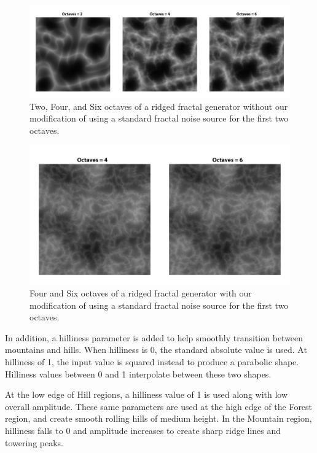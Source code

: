 \begin{figure}
	\centering
		\includegraphics[width=1.0\textwidth]{figures/original_ridged}
	\caption{Two, Four, and Six octaves of a ridged fractal generator without our modification of using a standard fractal noise source for the first two octaves.}
	\label{fig:original_ridged}
\end{figure}

\begin{figure}
	\centering
		\includegraphics[width=1.0\textwidth]{figures/my_ridged}
	\caption{Four and Six octaves of a ridged fractal generator with our modification of using a standard fractal noise source for the first two octaves.}
	\label{fig:my_ridged}
\end{figure}

In addition, a hilliness parameter is added to help smoothly transition between mountains and hills.
When hilliness is 0, the standard absolute value is used.
At hilliness of 1, the input value is squared instead to produce a parabolic shape.
Hilliness values between 0 and 1 interpolate between these two shapes.

At the low edge of Hill regions, a hilliness value of 1 is used along with low overall amplitude.
These same parameters are used at the high edge of the Forest region, and create smooth rolling hills of medium height.
In the Mountain region, hilliness falls to 0 and amplitude increases to create sharp ridge lines and towering peaks.


